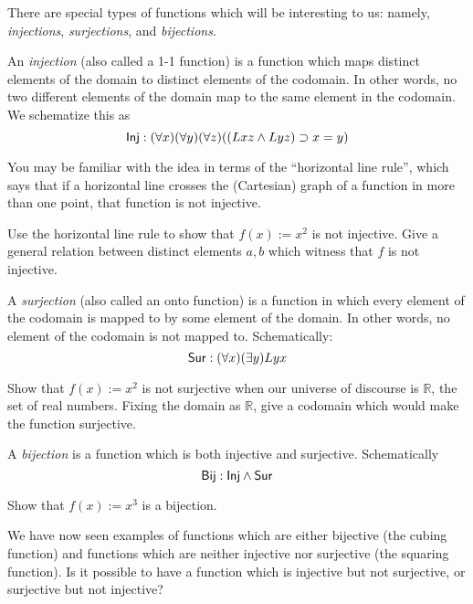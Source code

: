 There are special types of functions which will be interesting to us: namely, \emph{injections}, \emph{surjections}, and \emph{bijections}. 

\begin{definition}
An \emph{injection} (also called a 1-1 function) is a function which maps distinct elements of the domain to distinct elements of the codomain. In other words, no two different elements of the domain map to the same element in the codomain. We schematize this as
\[
    \mbox{$\mathsf{Inj}$}: (\forall x)(\forall y)(\forall z)((Lxz\wedge Lyz)\supset x=y)
\]
\end{definition}


You may be familiar with the idea in terms of the ``horizontal line rule'', which says that if a horizontal line crosses the (Cartesian) graph of a function in more than one point, that function is not injective.

\begin{aside}
    Use the horizontal line rule to show that $f(x) := x^2$ is not injective. Give a general relation between distinct elements $a, b$ which witness that $f$ is not injective. 
\end{aside}


\begin{definition}
A \emph{surjection} (also called an onto function) is a function in which every element of the codomain is mapped to by some element of the domain. In other words, no element of the codomain is not mapped to. Schematically:
\[
    \mbox{$\mathsf{Sur}$}: (\forall x)(\exists y)Lyx
\]
\end{definition}

\begin{aside}
    Show that $f(x) := x^2$ is not surjective when our universe of discourse is $\mathbb{R}$, the set of real numbers. Fixing the domain as $\mathbb{R}$, give a codomain which would make the function surjective. 
\end{aside}

\begin{definition}
A \emph{bijection} is a function which is both injective and surjective. Schematically
\[
    \mbox{$\mathsf{Bij}$}: \mbox{$\mathsf{Inj}$} \land \mbox{$\mathsf{Sur}$}
\]
\end{definition}

\begin{aside}
    Show that $f(x) := x^3$ is a bijection. 
\end{aside}

We have now seen examples of functions which are either bijective (the cubing function) and functions which are neither injective nor surjective (the squaring function). Is it possible to have a function which is injective but not surjective, or surjective but not injective?

